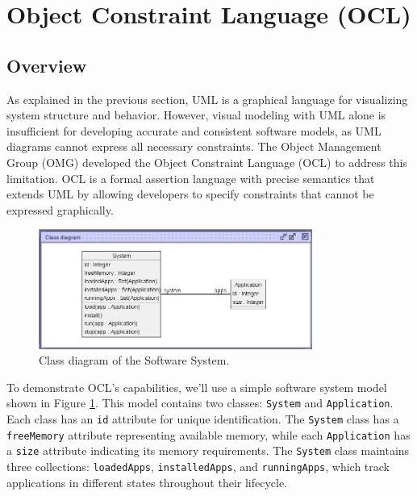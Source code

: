\section{Object Constraint Language (OCL)}
\label{sec:ocl}

\subsection{Overview}

\hspace{1cm} As explained in the previous section, UML is a graphical language for 
visualizing system structure and behavior. However, visual modeling with UML alone 
is insufficient for developing accurate and consistent software models, as UML 
diagrams cannot express all necessary constraints. The Object Management Group (OMG) 
developed the Object Constraint Language (OCL) to address this limitation. 
OCL is a formal assertion language with precise semantics that extends UML by 
allowing developers to specify constraints that cannot be expressed graphically. 

\begin{figure}
    \begin{center}
        \includegraphics[width=0.8\textwidth]{figures/c1/SoftwareSystem/SS_Ver2_Gray.png}
        \caption{Class diagram of the Software System.}
        \label{fig:class_diagram_software_system}
    \end{center}
\end{figure}

To demonstrate OCL's capabilities, we'll use a simple software system model shown 
in Figure \ref{fig:class_diagram_software_system}. This model contains two classes: 
\texttt{System} and \texttt{Application}. Each class has an \texttt{id} attribute 
for unique identification. The \texttt{System} class has a \texttt{freeMemory} attribute 
representing available memory, while each \texttt{Application} has a \texttt{size} 
attribute indicating its memory requirements. The \texttt{System} class maintains three 
collections: \texttt{loadedApps}, \texttt{installedApps}, and \texttt{runningApps}, which 
track applications in different states throughout their lifecycle.

